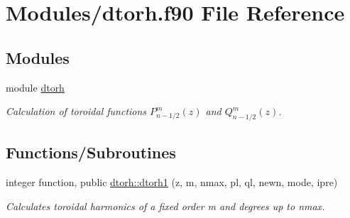 \hypertarget{dtorh_8f90}{}\section{Modules/dtorh.f90 File Reference}
\label{dtorh_8f90}
\subsection*{Modules}
\begin{DoxyCompactItemize}
\item 
module \hyperlink{namespacedtorh}{dtorh}
\begin{DoxyCompactList}\small\item\em Calculation of toroidal functions $P_{n-1/2}^m \left(z\right)$ and $Q_{n-1/2}^m \left(z\right)$. \end{DoxyCompactList}\end{DoxyCompactItemize}
\subsection*{Functions/\+Subroutines}
\begin{DoxyCompactItemize}
\item 
integer function, public \hyperlink{namespacedtorh_af3f58b6705da916bfbaf7cc4ea05f610}{dtorh\+::dtorh1} (z, m, nmax, pl, ql, newn, mode, ipre)
\begin{DoxyCompactList}\small\item\em Calculates toroidal harmonics of a fixed order {\ttfamily m} and degrees up to {\ttfamily nmax}. \end{DoxyCompactList}\end{DoxyCompactItemize}

